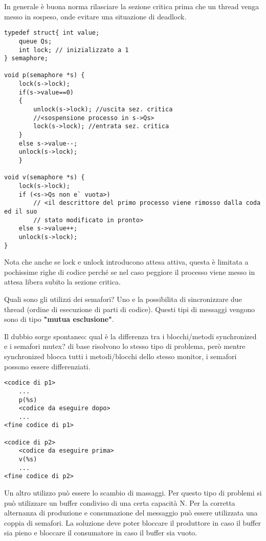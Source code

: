 \documentclass{article}
\begin{document}
\noindent In generale è buona norma rilasciare la sezione critica prima che un thread venga messo in sospeso, onde evitare una situazione
di deadlock.

\begin{lstlisting}[style=CStyle]
typedef struct{ int value;
    queue Qs;
    int lock; // inizializzato a 1
} semaphore;
 
void p(semaphore *s) {
    lock(s->lock);
    if(s->value==0)
    { 
        unlock(s->lock); //uscita sez. critica
        //<sospensione processo in s->Qs>
        lock(s->lock); //entrata sez. critica
    }
    else s->value--;
    unlock(s->lock);
    }

void v(semaphore *s) {
    lock(s->lock);
    if (<s->Qs non e` vuota>)
        // <il descrittore del primo processo viene rimosso dalla coda ed il suo
        // stato modificato in pronto>
    else s->value++;
    unlock(s->lock);
}
\end{lstlisting}

\noindent Nota che anche se lock e unlock introducono attesa attiva, questa è limitata a pochissime righe di codice perché se nel 
caso peggiore il processo viene messo in attesa libera subito la sezione critica.
\medskip

\noindent Quali sono gli utilizzi dei semafori? Uno e la possibilita di sincronizzare due thread (ordine di
 esecuzione di parti di codice). Questi tipi di messaggi vengono sono di tipo \textbf{"mutua esclusione"}.

\noindent Il dubbio sorge spontaneo: qual è la differenza tra i blocchi/metodi synchronized e i semafori mutex? di base risolvono 
lo stesso tipo di problema, però mentre synchronized blocca tutti i metodi/blocchi dello stesso monitor, i semafori possono essere differenziati.

\begin{lstlisting}[style=CStyle]
<codice di p1>
    ...
    p(%s)
    <codice da eseguire dopo>
    ...
<fine codice di p1>

<codice di p2>
    <codice da eseguire prima>
    v(%s)
    ...
<fine codice di p2>
\end{lstlisting}

\noindent Un altro utilizzo può essere lo scambio di massaggi. Per questo tipo di problemi si può utilizzare un buffer condiviso di
 una certa capacità N. Per la corretta alternanza di produzione e consumazione del messaggio può essere utilizzata una coppia di semafori. 
 La soluzione deve poter bloccare il produttore in caso il buffer sia pieno e bloccare il consumatore in caso il buffer sia vuoto.
\end{document}
